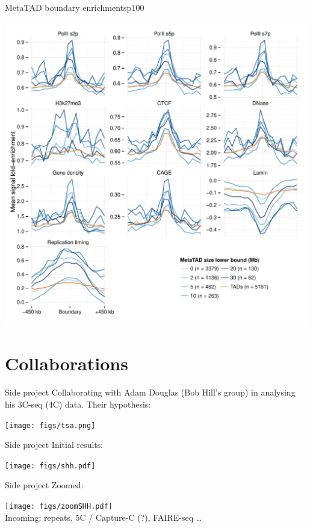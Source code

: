 \documentclass{beamer}
\begin{document}
\begin{frame}{MetaTAD boundary enrichments}{p100}

\centering
\includegraphics[width=.75\textwidth]{../figs/metatad_cutoffenrich.pdf}

\end{frame}


\section{Collaborations}
\begin{frame}{Side project}
Collaborating with Adam Douglas (Bob Hill's group) in analysing his
3C-seq (4C) data. Their hypothesis: \\

\vspace{1em}

\centering

\texttt{[image: figs/tsa.png]}
\end{frame}

\begin{frame}{Side project}
Initial results: \\

\vspace{1em}

\centering

\texttt{[image: figs/shh.pdf]} \\
\end{frame}

\begin{frame}{Side project}
Zoomed: \\

\vspace{1em}

\centering

\texttt{[image: figs/zoomSHH.pdf]} \\

Incoming: repeats, 5C / Capture-C (?), FAIRE-seq \dots
\end{frame}
\end{document}
